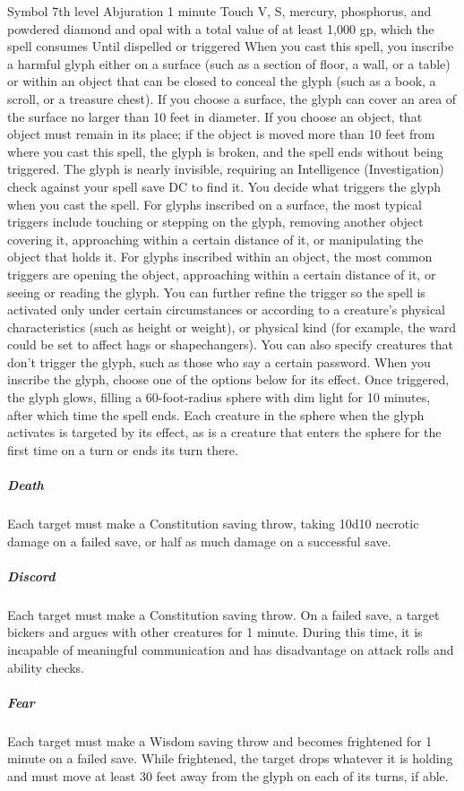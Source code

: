 \documentclass[10pt,a4paper,twoside,bg=print,twocolumn,openany,nodeprecatedcode]{dndbook}
\begin{document}
\DndSpellHeader%
{Symbol}
{7th level Abjuration}
{1 minute}
{Touch}
{V, S, mercury, phosphorus, and powdered diamond and opal with a total value of at least 1,000 gp, which the spell consumes}
{Until dispelled or triggered}
When you cast this spell, you inscribe a harmful glyph either on a surface (such as a section of floor, a wall, or a table) or within an object that can be closed to conceal the glyph (such as a book, a scroll, or a treasure chest). If you choose a surface, the glyph can cover an area of the surface no larger than 10 feet in diameter. If you choose an object, that object must remain in its place; if the object is moved more than 10 feet from where you cast this spell, the glyph is broken, and the spell ends without being triggered.
The glyph is nearly invisible, requiring an Intelligence (Investigation) check against your spell save DC to find it.
You decide what triggers the glyph when you cast the spell. For glyphs inscribed on a surface, the most typical triggers include touching or stepping on the glyph, removing another object covering it, approaching within a certain distance of it, or manipulating the object that holds it. For glyphs inscribed within an object, the most common triggers are opening the object, approaching within a certain distance of it, or seeing or reading the glyph.
You can further refine the trigger so the spell is activated only under certain circumstances or according to a creature's physical characteristics (such as height or weight), or physical kind (for example, the ward could be set to affect hags or shapechangers). You can also specify creatures that don't trigger the glyph, such as those who say a certain password.
When you inscribe the glyph, choose one of the options below for its effect. Once triggered, the glyph glows, filling a 60-foot-radius sphere with dim light for 10 minutes, after which time the spell ends. Each creature in the sphere when the glyph activates is targeted by its effect, as is a creature that enters the sphere for the first time on a turn or ends its turn there.
\subparagraph{Death}
Each target must make a Constitution saving throw, taking 10d10 necrotic damage on a failed save, or half as much damage on a successful save.
\subparagraph{Discord}
Each target must make a Constitution saving throw. On a failed save, a target bickers and argues with other creatures for 1 minute. During this time, it is incapable of meaningful communication and has disadvantage on attack rolls and ability checks.
\subparagraph{Fear}
Each target must make a Wisdom saving throw and becomes frightened for 1 minute on a failed save. While frightened, the target drops whatever it is holding and must move at least 30 feet away from the glyph on each of its turns, if able.
\end{document}
